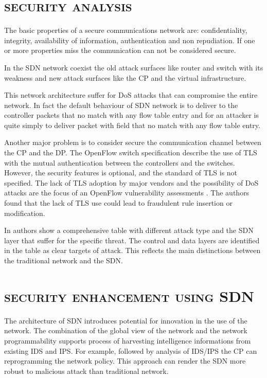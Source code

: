 %
\section*{\small \textsc{security analysis}}
The basic properties of a secure communications network are: confidentiality, integrity, availability of information, authentication and non repudiation. If one or more properties miss the communication can not be considered secure.

In the \ac{SDN} network coexist the old attack surfaces like router and switch with its weakness and new attack surfaces like the \ac{CP} and the virtual infrastructure.

This network architecture suffer for \ac{DoS} attacks that can compromise the entire network. In fact the default behaviour of \ac{SDN} network is to deliver to the controller packets that no match with any flow table entry and for an attacker is quite simply to deliver packet with field that no match with any flow table entry.

Another major problem is to consider secure the communication channel between the 	\ac{CP} and the \ac{DP}. The OpenFlow switch specification \cite{onf:openflow-specifications} describe the use of \ac{TLS} with the mutual authentication between the controllers and the switches. However, the security features is optional, and the standard of \ac{TLS} is not specified. The lack of \ac{TLS} adoption by major vendors and the possibility of \ac{DoS} attacks are the focus of an OpenFlow vulnerability assessments \cite{acm:openflow-vulnerability}. The authors found that the lack of \ac{TLS} use could lead to fraudulent rule insertion or modification.

In \cite{sdn-openflow-security} authors show a comprehensive table with different attack type and the \ac{SDN} layer that suffer for the specific threat. The control and data layers are identified in the table as clear targets of attack. This reflects the main distinctions between the traditional network and the \ac{SDN}.

\section*{\small \textsc{security enhancement using \ac{SDN}}}
The architecture of \ac{SDN} introduces potential for innovation in the use of the network. The combination of the global view of the network and the network programmability supports process of harvesting intelligence informations from existing \ac{IDS} and \ac{IPS}. For example, followed by analysis of \ac{IDS}/\ac{IPS} the \ac{CP} can reprogramming the network policy. This approach can render the \ac{SDN} more robust to malicious attack than traditional network.

